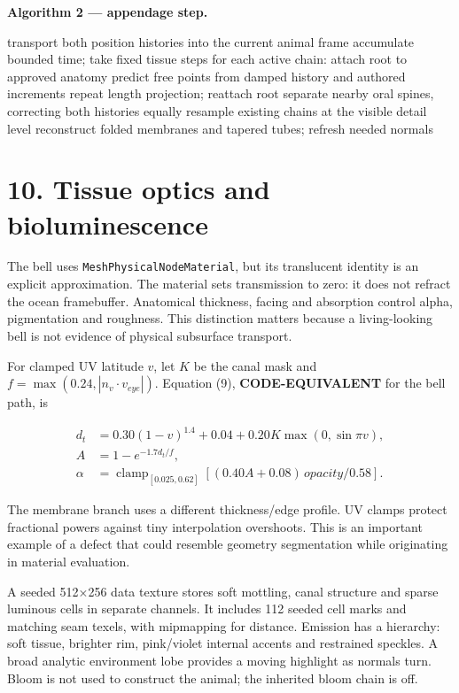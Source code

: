 \documentclass[
  english,
  11pt,
]{article}
\newenvironment{Shaded}{}{}
\newcommand{\NormalTok}[1]{#1}
\begin{document}
\textbf{Algorithm 2 --- appendage step.}

\begin{Shaded}
\begin{Highlighting}[]
\NormalTok{transport both position histories into the current animal frame}
\NormalTok{accumulate bounded time; take fixed tissue steps}
\NormalTok{for each active chain:}
\NormalTok{    attach root to approved anatomy}
\NormalTok{    predict free points from damped history and authored increments}
\NormalTok{    repeat length projection; reattach root}
\NormalTok{separate nearby oral spines, correcting both histories equally}
\NormalTok{resample existing chains at the visible detail level}
\NormalTok{reconstruct folded membranes and tapered tubes; refresh needed normals}
\end{Highlighting}
\end{Shaded}

\section{10. Tissue optics and
bioluminescence}\label{tissue-optics-and-bioluminescence}

The bell uses \texttt{MeshPhysicalNodeMaterial}, but its translucent
identity is an explicit approximation. The material sets transmission to
zero: it does not refract the ocean framebuffer. Anatomical thickness,
facing and absorption control alpha, pigmentation and roughness. This
distinction matters because a living-looking bell is not evidence of
physical subsurface transport.

For clamped UV latitude \(v\), let \(K\) be the canal mask and
\(f=\max(0.24,|n_v\cdot v_{eye}|)\). Equation (9),
\textbf{CODE-EQUIVALENT} for the bell path, is

\[
\begin{aligned}
d_t&=0.30(1-v)^{1.4}+0.04+0.20K\max(0,\sin\pi v),\\
A&=1-e^{-1.7d_t/f},\\
\alpha&=\operatorname{clamp}_{[0.025,0.62]}
 [(0.40A+0.08)\,opacity/0.58].
\end{aligned}
\]

The membrane branch uses a different thickness/edge profile. UV clamps
protect fractional powers against tiny interpolation overshoots. This is
an important example of a defect that could resemble geometry
segmentation while originating in material evaluation.

A seeded 512×256 data texture stores soft mottling, canal structure and
sparse luminous cells in separate channels. It includes 112 seeded cell
marks and matching seam texels, with mipmapping for distance. Emission
has a hierarchy: soft tissue, brighter rim, pink/violet internal accents
and restrained speckles. A broad analytic environment lobe provides a
moving highlight as normals turn. Bloom is not used to construct the
animal; the inherited bloom chain is off.
\end{document}
